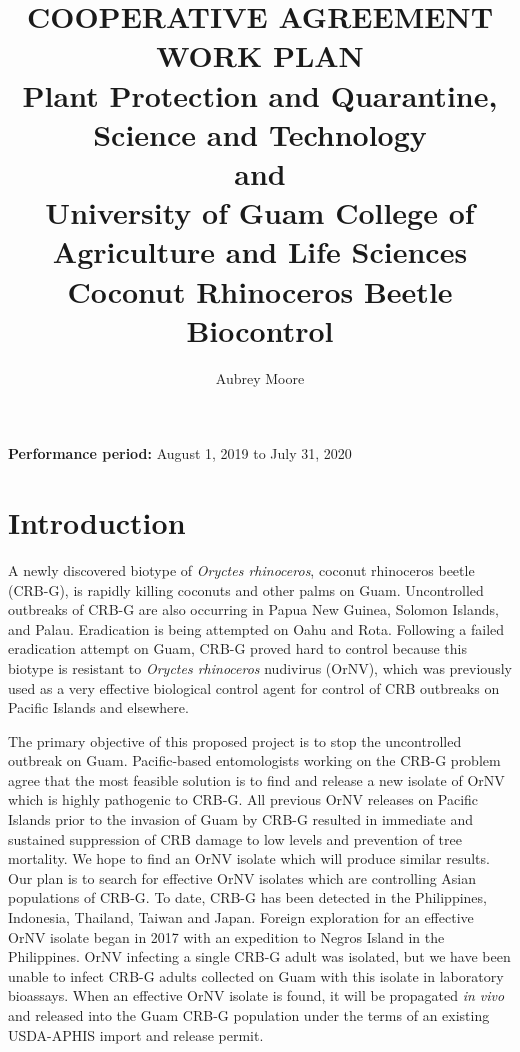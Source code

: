 \documentclass[14pt,english,letterpaper]{scrartcl}
\title{\small COOPERATIVE AGREEMENT WORK PLAN\\
Plant Protection and Quarantine, Science and Technology\\	
and\\
University of Guam College of Agriculture and Life Sciences\\
{\bigskip}
\Huge Coconut Rhinoceros Beetle Biocontrol}
\author{Aubrey Moore}
\begin{document}
\maketitle
\newpage
\tableofcontents
\pagebreak


\textbf{Performance period:} August 1, 2019 to July 31, 2020

\section{Introduction}

%

A newly discovered biotype of \textit{Oryctes rhinoceros}, coconut rhinoceros beetle (CRB-G), is rapidly
killing coconuts and other palms on Guam. Uncontrolled outbreaks of CRB-G are also occurring
in Papua New Guinea, Solomon Islands, and Palau. Eradication is being attempted on Oahu and
Rota. Following a failed eradication attempt on Guam, CRB-G proved hard to control because
this biotype is resistant to \textit{Oryctes rhinoceros} nudivirus (OrNV), which was previously used as a
very effective biological control agent for control of CRB outbreaks on Pacific Islands and
elsewhere.

The primary objective of this proposed project is to stop the uncontrolled outbreak on Guam.
Pacific-based entomologists working on the CRB-G problem agree that the most feasible
solution is to find and release a new isolate of OrNV which is highly pathogenic to CRB-G. All
previous OrNV releases on Pacific Islands prior to the invasion of Guam by CRB-G resulted in
immediate and sustained suppression of CRB damage to low levels and prevention of tree
mortality. We hope to find an OrNV isolate which will produce similar results. Our plan is to
search for effective OrNV isolates which are controlling Asian populations of CRB-G. To date,
CRB-G has been detected in the Philippines, Indonesia, Thailand, Taiwan and Japan. Foreign
exploration for an effective OrNV isolate began in 2017 with an expedition to Negros Island in
the Philippines. OrNV infecting a single CRB-G adult was isolated, but we have been unable
to infect CRB-G adults collected on Guam with this isolate in laboratory bioassays. When an
effective OrNV isolate is found, it will be propagated \textit{in vivo} and released into the Guam CRB-G
population under the terms of an existing USDA-APHIS import and release permit.
\end{document}
